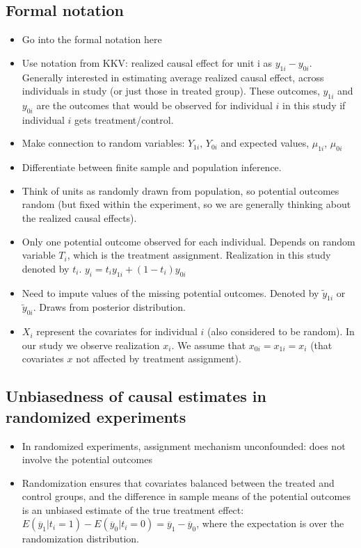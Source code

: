 \documentclass[11pt,titlepage]{article}
\begin{document}
\subsection{Formal notation}
\begin{itemize}
\item Go into the formal notation here
\item Use notation from KKV: realized causal effect for unit i as $y_{1i} - y_{0i}$.  Generally interested in estimating average realized causal
effect, across individuals in study (or just those in treated group).  These outcomes, $y_{1i}$ and $y_{0i}$ are the outcomes that would be observed
for individual $i$ in this study if individual $i$ gets treatment/control.
\item Make connection to random variables: $Y_{1i}$, $Y_{0i}$ and expected values, $\mu_{1i}$, $\mu_{0i}$
\item Differentiate between finite sample and population inference.  
\item Think of units as randomly drawn from population, so potential outcomes random (but fixed within the experiment, so we are generally thinking
about the realized causal effects).
\item Only one potential outcome observed for each individual.  
Depends on random variable $T_i$, which is the treatment assignment.  Realization in this study denoted by $t_i$.  $y_i = t_i y_{1i} + (1-t_i) y_{0i}$
\item Need to impute values of the missing potential outcomes.  Denoted by $\tilde{y}_{1i}$ or $\tilde{y}_{0i}$.  Draws from posterior distribution. 
\item $X_i$ represent the covariates for individual $i$ (also considered to be random).  In our study we observe realization $x_i$.  
We assume that $x_{0i}=x_{1i}=x_i$ (that covariates $x$ not affected by treatment assignment).
\end{itemize}

\subsection{Unbiasedness of causal estimates in randomized experiments}
\begin{itemize}
\item In randomized experiments, assignment mechanism unconfounded: does not involve the potential outcomes
\item Randomization ensures that covariates balanced between the treated and control groups, and the difference in sample means of the potential outcomes
is an unbiased estimate of the true treatment effect:   $E(\overline{y}_1|t_i=1) - E(\overline{y}_0|t_i=0) = \overline{y}_1 - \overline{y}_0$, where the expectation
is over the randomization distribution. 
\end{itemize} 
\end{document}
